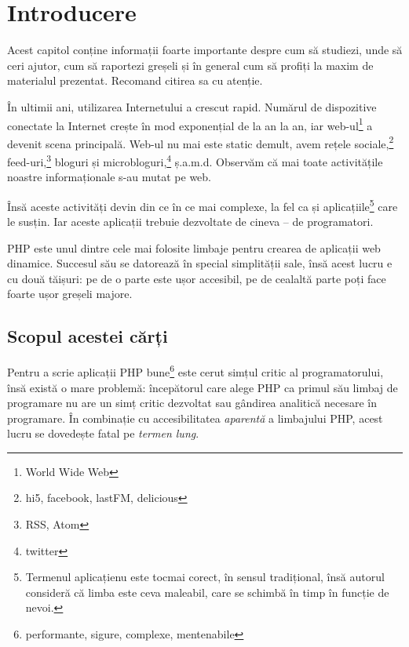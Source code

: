 \fancyfoot[CO,C] {\thepage}
{}
\chapter*{Introducere}

\begin{chapsummary}

Acest capitol conține informații foarte importante despre cum să studiezi, unde
să ceri ajutor, cum să raportezi greșeli și în general cum să profiți la maxim
de materialul prezentat. Recomand citirea sa cu atenție.

\end{chapsummary}

În ultimii ani, utilizarea Internetului a crescut rapid. Numărul de dispozitive
conectate la Internet crește în mod exponențial de la an la an, iar
web-ul\footnote
{World Wide Web} a devenit scena principală. Web-ul nu mai este static demult,
avem rețele sociale,\footnote{hi5, facebook, lastFM, delicious}
feed-uri,\footnote{RSS, Atom} bloguri și microbloguri,\footnote{twitter}
ș.a.m.d. Observăm că mai toate activitățile noastre informaționale s-au mutat 
pe web.

Însă aceste activități devin din ce în ce mai complexe, la fel ca și
aplicațiile\footnote{Termenul \glqq aplicație\grqq nu este tocmai corect, în sensul
tradițional, însă autorul consideră că limba este ceva maleabil, care se
schimbă în timp în funcție de nevoi.} care le susțin.
Iar aceste aplicații trebuie dezvoltate de cineva -- de programatori.

PHP este unul dintre cele mai folosite limbaje pentru crearea de aplicații
web dinamice. Succesul său se datorează în special simplității sale, însă
acest lucru e cu două tăișuri: pe de o parte este ușor accesibil, pe de
cealaltă parte poți face foarte ușor greșeli majore.

{}
\section*{Scopul acestei cărți}

Pentru a scrie aplicații PHP bune\footnote{performante, sigure, complexe, mentenabile}
este cerut simțul critic al programatorului,
însă există o mare problemă: începătorul care alege PHP ca
primul său limbaj de programare nu are un simț critic dezvoltat sau gândirea analitică
necesare în programare. În combinație cu accesibilitatea \textit{aparentă}
a limbajului PHP, acest lucru se dovedește fatal pe \textit{termen lung}.

